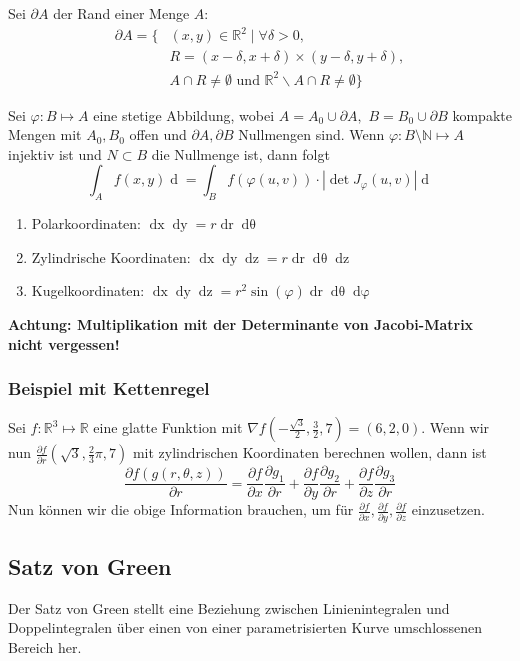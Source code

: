 \documentclass[a4paper,10pt]{article}
\def\R{\mathbb{R}}
\def\N{\mathbb{N}}
\begin{document}
Sei \(\partial A\) der Rand einer Menge \(A\):
\begin{align*}
    \partial A = \Big\{ &(x,y) \in \R^2 \mid \forall \delta > 0, \\ &R = (x - \delta, x + \delta) \times (y - \delta, y + \delta), \\
    &A \cap R \neq \emptyset \text{ und } \R^2 \backslash A \cap R \neq \emptyset \Big\}
\end{align*}

Sei \(\varphi : B \mapsto A\) eine stetige Abbildung, wobei \(A= A_0 \cup \partial A, \) \(B = B_0 \cup \partial B\) kompakte Mengen mit \(A_0, B_0\) offen und \(\partial A, \partial B\) Nullmengen sind. Wenn \(\varphi : B \setminus \N \mapsto A\) injektiv ist und \(N \subset B\) die Nullmenge ist, dann folgt
\[\int_A f(x,y) \mathop{d(x,y)} = \int_B f(\varphi(u,v)) \cdot \left|\det J_\varphi (u,v)\right| \mathop{d(u,v)}\]
\begin{enumerate}
  \item Polarkoordinaten: \(\mathop{dx}\mathop{dy} = r \mathop{dr} \mathop{d\theta}\)
  \item Zylindrische Koordinaten: \(\mathop{dx} \mathop{dy} \mathop{dz} = r \mathop{dr} \mathop{d\theta} \mathop{dz}\)
  \item Kugelkoordinaten: \(\mathop{dx}\mathop{dy}\mathop{dz} = r^2 \sin(\varphi) \mathop{dr} \mathop{d\theta} \mathop{d\varphi}\)
\end{enumerate}

\textbf{Achtung: Multiplikation mit der Determinante von Jacobi-Matrix nicht vergessen!}

\subsubsection*{Beispiel mit Kettenregel}
Sei \(f: \R^3 \mapsto \R\) eine glatte Funktion mit \(\nabla f \left(-\frac{\sqrt{3}}{2}, \frac{3}{2},7\right) = (6,2,0)\). Wenn wir nun \(\frac{\partial f}{\partial r}\left(\sqrt{3}, \frac{2}{3}\pi, 7\right)\) mit zylindrischen Koordinaten berechnen wollen, dann ist
\[\frac{\partial f(g(r,\theta,z))}{\partial r} = \frac{\partial f}{\partial x} \frac{\partial g_1}{\partial r} + \frac{\partial f}{\partial y} \frac{\partial g_2}{\partial r} + \frac{\partial f}{\partial z} \frac{\partial g_3}{\partial r}\]
Nun können wir die obige Information brauchen, um für \(\frac{\partial f}{\partial x}, \frac{\partial f}{\partial y}, \frac{\partial f}{\partial z}\) einzusetzen.

\subsection{Satz von Green}
Der Satz von Green stellt eine Beziehung zwischen Linienintegralen und Doppelintegralen über einen von einer parametrisierten Kurve umschlossenen Bereich her. 
\end{document}
